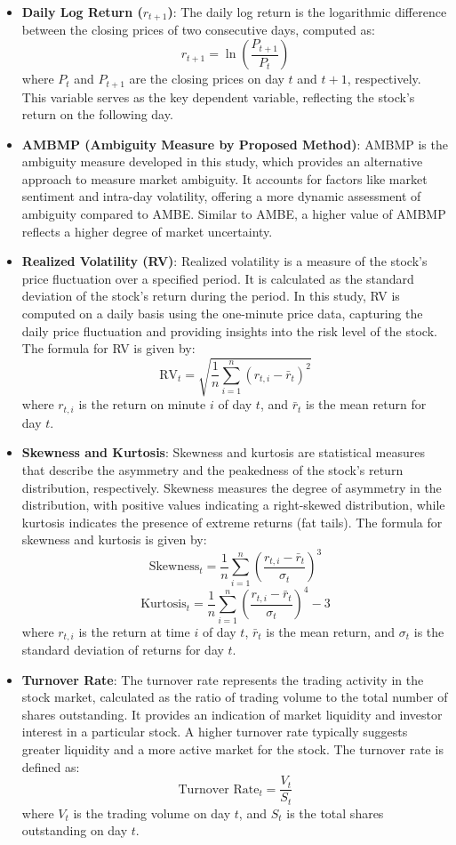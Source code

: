 \documentclass[preprint,12pt,authoryear]{elsarticle}
\begin{document}
\begin{itemize}
    \item \textbf{Daily Log Return ($r_{t+1}$)}: The daily log return is the logarithmic difference between the closing prices of two consecutive days, computed as:
    \[
    r_{t+1} = \ln\left(\frac{P_{t+1}}{P_t}\right)
    \]
    where $P_t$ and $P_{t+1}$ are the closing prices on day $t$ and $t+1$, respectively. This variable serves as the key dependent variable, reflecting the stock's return on the following day.
    
    \item \textbf{AMBMP (Ambiguity Measure by Proposed Method)}: AMBMP is the ambiguity measure developed in this study, which provides an alternative approach to measure market ambiguity. It accounts for factors like market sentiment and intra-day volatility, offering a more dynamic assessment of ambiguity compared to AMBE. Similar to AMBE, a higher value of AMBMP reflects a higher degree of market uncertainty.
    
    \item \textbf{Realized Volatility (RV)}: Realized volatility is a measure of the stock's price fluctuation over a specified period. It is calculated as the standard deviation of the stock's return during the period. In this study, RV is computed on a daily basis using the one-minute price data, capturing the daily price fluctuation and providing insights into the risk level of the stock. The formula for RV is given by:
    \[
    \mathrm{RV}_t = \sqrt{\frac{1}{n} \sum_{i=1}^{n} (r_{t,i} - \bar{r}_t)^2}
    \]
    where $r_{t,i}$ is the return on minute $i$ of day $t$, and $\bar{r}_t$ is the mean return for day $t$.

    \item \textbf{Skewness and Kurtosis}: Skewness and kurtosis are statistical measures that describe the asymmetry and the peakedness of the stock's return distribution, respectively. Skewness measures the degree of asymmetry in the distribution, with positive values indicating a right-skewed distribution, while kurtosis indicates the presence of extreme returns (fat tails). The formula for skewness and kurtosis is given by:
    \[
    \text{Skewness}_t = \frac{1}{n} \sum_{i=1}^{n} \left( \frac{r_{t,i} - \bar{r}_t}{\sigma_t} \right)^3
    \]
    \[
    \text{Kurtosis}_t = \frac{1}{n} \sum_{i=1}^{n} \left( \frac{r_{t,i} - \bar{r}_t}{\sigma_t} \right)^4 - 3
    \]
    where $r_{t,i}$ is the return at time $i$ of day $t$, $\bar{r}_t$ is the mean return, and $\sigma_t$ is the standard deviation of returns for day $t$.

    \item \textbf{Turnover Rate}: The turnover rate represents the trading activity in the stock market, calculated as the ratio of trading volume to the total number of shares outstanding. It provides an indication of market liquidity and investor interest in a particular stock. A higher turnover rate typically suggests greater liquidity and a more active market for the stock. The turnover rate is defined as:
    \[
    \text{Turnover Rate}_t = \frac{V_t}{S_t}
    \]
    where $V_t$ is the trading volume on day $t$, and $S_t$ is the total shares outstanding on day $t$.
\end{itemize}
\end{document}
